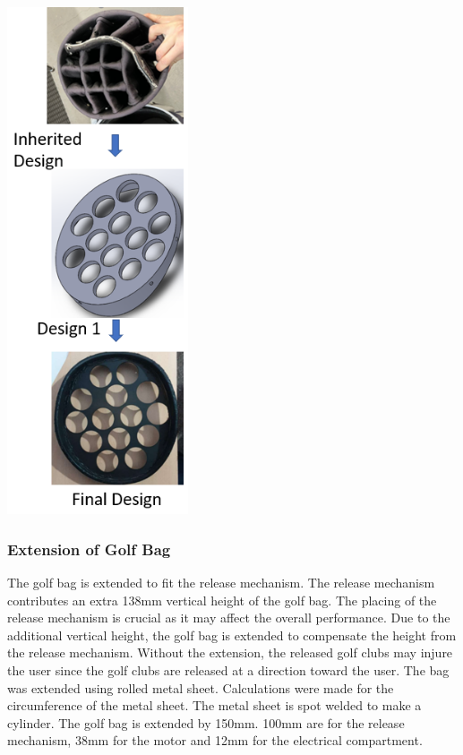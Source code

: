 \documentclass[11pt,landscape]{article}
\newenvironment{Figure}
  {\par\medskip\noindent\minipage{\linewidth}}
  {\endminipage\par\medskip}
\begin{document}
\begin{multicols}{3}
    \begin{Figure}
        \begin{center}
            \includegraphics[width=0.4\textwidth]{Figure.png}
            \label{fig:change}
        \end{center}
    \end{Figure}

    
    
    \subsubsection{Extension of Golf Bag}
    The golf bag is extended to fit the release mechanism. The release mechanism
    contributes an extra 138mm vertical height of the golf bag. The placing of the
    release mechanism is crucial as it may affect the overall performance. Due
    to the additional vertical height, the golf bag is extended to compensate
    the height from the release mechanism. Without the extension, the released
    golf clubs may injure the user since the golf clubs are released at a
    direction toward the user. The bag was extended using rolled metal
    sheet. Calculations were made for the circumference of the metal sheet.
    The metal sheet is spot welded to make a cylinder. The golf bag is
    extended by 150mm. 100mm are for the release mechanism, 38mm for the motor
    and 12mm for the electrical compartment.
    

\end{multicols}
\end{document}
